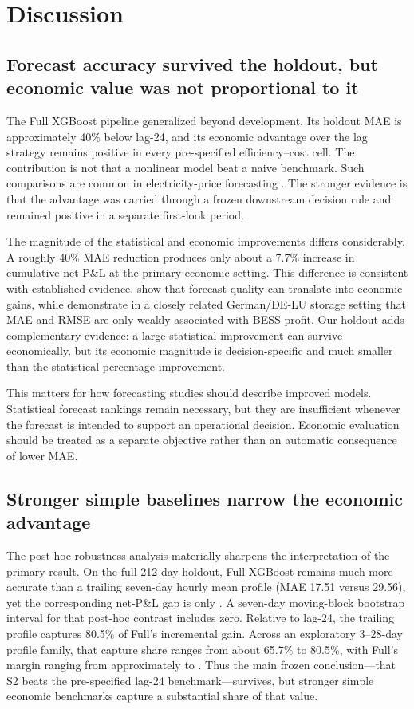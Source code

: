 \section{Discussion}
\label{sec:discussion}

\subsection{Forecast accuracy survived the holdout, but economic value was not proportional to it}

The Full XGBoost pipeline generalized beyond development. Its holdout MAE is approximately 40\% below lag-24, and its economic advantage over the lag strategy remains positive in every pre-specified efficiency--cost cell. The contribution is not that a nonlinear model beat a naive benchmark. Such comparisons are common in electricity-price forecasting \citep{lago2021}. The stronger evidence is that the advantage was carried through a frozen downstream decision rule and remained positive in a separate first-look period.

The magnitude of the statistical and economic improvements differs considerably. A roughly 40\% MAE reduction produces only about a 7.7\% increase in cumulative net P\&L at the primary economic setting. This difference is consistent with established evidence. \citet{kathziel2018} show that forecast quality can translate into economic gains, while \citet{maciejowska2026} demonstrate in a closely related German/DE-LU storage setting that MAE and RMSE are only weakly associated with BESS profit. Our holdout adds complementary evidence: a large statistical improvement can survive economically, but its economic magnitude is decision-specific and much smaller than the statistical percentage improvement.

This matters for how forecasting studies should describe improved models. Statistical forecast rankings remain necessary, but they are insufficient whenever the forecast is intended to support an operational decision. Economic evaluation should be treated as a separate objective rather than an automatic consequence of lower MAE.

\subsection{Stronger simple baselines narrow the economic advantage}

The post-hoc robustness analysis materially sharpens the interpretation of the primary result. On the full 212-day holdout, Full XGBoost remains much more accurate than a trailing seven-day hourly mean profile (MAE 17.51 versus 29.56), yet the corresponding net-P\&L gap is only . A seven-day moving-block bootstrap interval for that post-hoc contrast includes zero. Relative to lag-24, the trailing profile captures 80.5\% of Full's  incremental gain. Across an exploratory 3--28-day profile family, that capture share ranges from about 65.7\% to 80.5\%, with Full's margin ranging from approximately  to . Thus the main frozen conclusion---that S2 beats the pre-specified lag-24 benchmark---survives, but stronger simple economic benchmarks capture a substantial share of that value.

